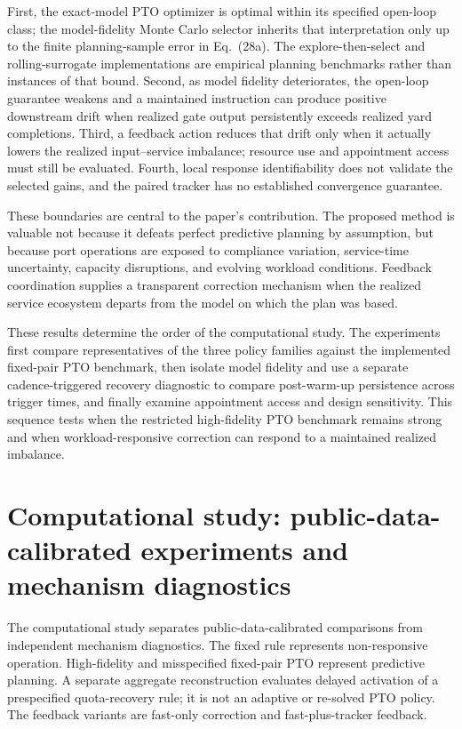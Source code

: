\documentclass[preprint,12pt,authoryear,a4paper]{elsarticle}
\begin{document}
First, the exact-model PTO optimizer is optimal within its specified open-loop class; the model-fidelity Monte Carlo selector inherits that interpretation only up to the finite planning-sample error in Eq.~(28a). The explore-then-select and rolling-surrogate implementations are empirical planning benchmarks rather than instances of that bound. Second, as model fidelity deteriorates, the open-loop guarantee weakens and a maintained instruction can produce positive downstream drift when realized gate output persistently exceeds realized yard completions. Third, a feedback action reduces that drift only when it actually lowers the realized input--service imbalance; resource use and appointment access must still be evaluated. Fourth, local response identifiability does not validate the selected gains, and the paired tracker has no established convergence guarantee.

These boundaries are central to the paper's contribution. The proposed method is valuable not because it defeats perfect predictive planning by assumption, but because port operations are exposed to compliance variation, service-time uncertainty, capacity disruptions, and evolving workload conditions. Feedback coordination supplies a transparent correction mechanism when the realized service ecosystem departs from the model on which the plan was based.

These results determine the order of the computational study. The experiments first compare representatives of the three policy families against the implemented fixed-pair PTO benchmark, then isolate model fidelity and use a separate cadence-triggered recovery diagnostic to compare post-warm-up persistence across trigger times, and finally examine appointment access and design sensitivity. This sequence tests when the restricted high-fidelity PTO benchmark remains strong and when workload-responsive correction can respond to a maintained realized imbalance.

\section{Computational study: public-data-calibrated experiments and mechanism diagnostics}
\label{sec:computational-study}

The computational study separates public-data-calibrated comparisons from independent mechanism diagnostics. The fixed rule represents non-responsive operation. High-fidelity and misspecified fixed-pair PTO represent predictive planning. A separate aggregate reconstruction evaluates delayed activation of a prespecified quota-recovery rule; it is not an adaptive or re-solved PTO policy. The feedback variants are fast-only correction and fast-plus-tracker feedback.
\end{document}
